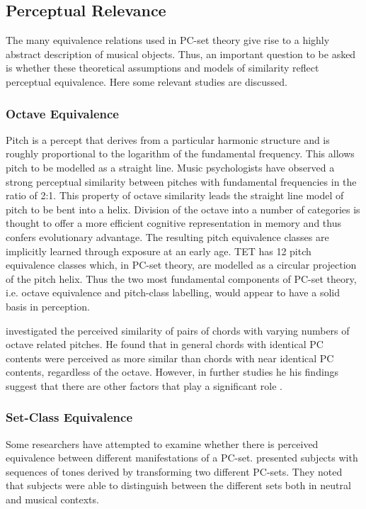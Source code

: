 \documentclass{article}
\begin{document}
\subsection{Perceptual Relevance}
\label{sec-3-5}

The many equivalence relations used in PC-set theory give rise to a
highly abstract description of musical objects. Thus, an important
question to be asked is whether these theoretical assumptions and
models of similarity reflect perceptual equivalence. Here some
relevant studies are discussed.
\subsubsection{Octave Equivalence}
\label{sec-3-5-1}

Pitch is a percept that derives from a particular harmonic structure
and is roughly proportional to the logarithm of the fundamental
frequency. This allows pitch to be modelled as a straight line. Music
psychologists have observed a strong perceptual similarity between
pitches with fundamental frequencies in the ratio of 2:1. This
property of octave similarity leads the straight line model of pitch
to be bent into a helix. Division of the octave into a number of
categories is thought to offer a more efficient cognitive
representation in memory and thus confers evolutionary advantage. The
resulting pitch equivalence classes are implicitly learned through
exposure at an early age. TET has 12 pitch equivalence classes which,
in PC-set theory, are modelled as a circular projection of the pitch
helix. Thus the two most fundamental components of PC-set theory,
i.e. octave equivalence and pitch-class labelling, would appear to
have a solid basis in perception.

\citet{Gibson1988} investigated the perceived similarity of pairs of
chords with varying numbers of octave related pitches. He found that
in general chords with identical PC contents were perceived as more
similar than chords with near identical PC contents, regardless of
the octave. However, in further studies he his findings suggest that
there are other factors that play a significant role
\citep{Gibson1993}.
\subsubsection{Set-Class Equivalence}
\label{sec-3-5-2}

Some researchers have attempted to examine whether there is perceived
equivalence between different manifestations of a
PC-set. \citet{KrumhanslSandell1987} presented subjects with sequences
of tones derived by transforming two different PC-sets. They noted
that subjects were able to distinguish between the different sets both
in neutral and musical contexts.  
\end{document}
